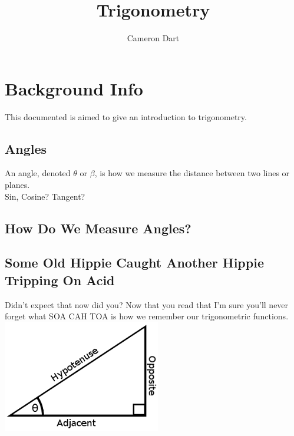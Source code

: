 \documentclass[11pt]{article}
\theoremstyle{plain}
\theoremstyle{definition}
\begin{document}
\title{Trigonometry}
\author{Cameron Dart}
\maketitle

\section{Background Info}

This documented is aimed to give an introduction to trigonometry.

\subsection{Angles}
An angle, denoted $\theta$ or $\beta$, is how we measure the distance between two lines or planes.\\
Sin, Cosine? Tangent?
\subsection{How Do We Measure Angles?}\label{section:mathmode}

\subsection{Some Old Hippie Caught Another Hippie Tripping On Acid}\label{section:mathmode}
Didn't expect that now did you?  Now that you read that I'm sure you'll never forget what SOA CAH TOA is how we remember our trigonometric functions.\\
\includegraphics[scale=0.5]{img/triangle.png}
\end{document}
